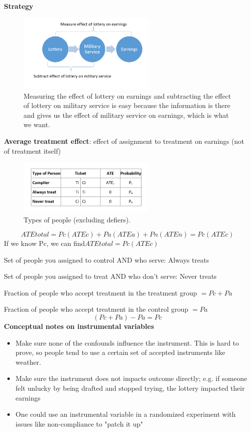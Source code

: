 \textbf{Strategy}
\begin{figure}[ht]
 \begin{center}
   \includegraphics[width=0.6\textwidth]{Figures/Figure_4.PNG}
    \caption{
    Measuring the effect of lottery on earnings and subtracting the effect of lottery on military service is easy because the information is there and gives us the effect of military service on earnings, which is what we want.}
    \label{fig:Figure_3}
  \end{center}
\end{figure} \newline 
\newpage
\textbf{Average treatment effect}: effect of assignment to treatment on earnings (not of treatment itself)
\begin{figure}[ht]
 \begin{center}
   \includegraphics[width=0.6\textwidth]{Figures/Figure_3.PNG}
    \caption{
    Types of people (excluding defiers).}
    \label{fig:Figure_4}
  \end{center}
\end{figure}
\[ATEtotal = Pc(ATEc) + Pa(ATEa) + Pn(ATEn) = Pc(ATEc)\] 
\newline
If we know Pc, we can find\(ATEtotal = Pc(ATEc)\)

Set of people you assigned to control AND who serve: Always treats 

Set of people you assigned to treat AND who don't serve: Never treats 

Fraction of people who accept treatment in the treatment group \( = Pc + Pa\) 

Fraction of people who accept treatment in the control group \( = Pa\) 
\[ (Pc + Pa) - Pa = Pc\]
\textbf{Conceptual notes on instrumental variables}
\begin{itemize}
\item Make sure none of the confounds influence the instrument. This is hard to prove, so people tend to use a certain set of accepted instruments like weather.
\item Make sure the instrument does not impacts outcome directly; e.g. if someone felt unlucky by being drafted and stopped trying, the lottery impacted their earnings
\item One could use an instrumental variable in a randomized experiment with issues like non-compliance to "patch it up" 
\end{itemize}

